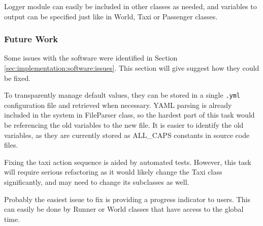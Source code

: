 Logger module can easily be included in other classes as needed, and variables
to output can be specified just like in World, Taxi or Passenger classes.


\subsubsection{Future Work}
\label{sec:maintenance_manual:future}

Some issues with the software were identified in Section
\ref{sec:implementation:software:issues}. This section will give suggest how
they could be fixed.

To transparently manage default values, they can be stored in a single
\texttt{.yml} configuration file and retrieved when necessary. YAML parsing is
already included in the system in FileParser class, so the hardest part of this
task would be referencing the old variables to the new file. It is easier to
identify the old variables, as they are currently stored as ALL\_CAPS constants
in source code files.

Fixing the taxi action sequence is aided by automated tests. However, this task
will require serious refactoring as it would likely change the Taxi class
significantly, and may need to change its subclasses as well.

Probably the easiest issue to fix is providing a progress indicator to users.
This can easily be done by Runner or World classes that have access to the
global time.
